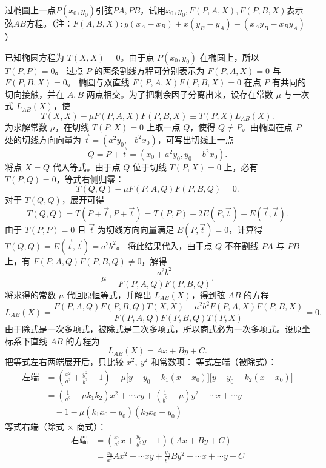 \begin{exercise}
过椭圆上一点$P(x_0,y_0)$引弦$PA,PB$，试用$x_0,y_0,F(P,A,X),F(P,B,X)$表示弦$AB$方程。（注：$F(A,B,X):y(x_A-x_B)+x(y_B-y_A)-(x_Ay_B-x_By_A)$）
\end{exercise}
\begin{solution}
已知椭圆方程为 $T(X,X) = 0$。由于点 $P(x_0,y_0)$ 在椭圆上，所以 $T(P,P) = 0$。
过点 $P$ 的两条割线方程可分别表示为 $F(P,A,X)=0$ 与 $F(P,B,X)=0$。
椭圆与双直线 $F(P,A,X)F(P,B,X)=0$ 在点 $P$ 有共同的切向接触，并在 $A,B$ 两点相交。为了把剩余因子分离出来，设存在常数 $\mu$ 与一次式 $L_{AB}(X)$，使
\[ T(X,X) - \mu F(P,A,X)F(P,B,X) \equiv T(P,X) L_{AB}(X). \]
为求解常数 $\mu$，在切线 $T(P,X)=0$ 上取一点 $Q$，使得 $Q \neq P$。由椭圆在点 $P$ 处的切线方向向量为 $\vec{t} = (a^2 y_0, -b^2 x_0)$，可写出切线上一点
\[ Q = P + \vec{t} = (x_0 + a^2 y_0, y_0 - b^2 x_0). \]
将点 $X = Q$ 代入等式。由于点 $Q$ 位于切线 $T(P,X)=0$ 上，必有 $T(P,Q) = 0$，等式右侧归零：
\[ T(Q,Q) - \mu F(P,A,Q)F(P,B,Q) = 0. \]
对于 $T(Q,Q)$，展开可得
\[ T(Q,Q) = T(P+\vec{t}, P+\vec{t}) = T(P,P) + 2E(P,\vec{t}) + E(\vec{t},\vec{t}). \]
由于 $T(P,P)=0$ 且 $\vec{t}$ 为切线方向向量满足 $E(P,\vec{t})=0$，计算得 $T(Q,Q) = E(\vec{t},\vec{t}) = a^2b^2$。
将此结果代入，由于点 $Q$ 不在割线 $PA$ 与 $PB$ 上，有 $F(P,A,Q)F(P,B,Q) \neq 0$，解得
\[ \mu = \frac{a^2b^2}{F(P,A,Q)F(P,B,Q)}. \]
将求得的常数 $\mu$ 代回原恒等式，并解出 $L_{AB}(X)$，得到弦 $AB$ 的方程
\[ L_{AB}(X) = \frac{F(P,A,Q) F(P,B,Q) T(X,X) - a^2b^2 F(P,A,X) F(P,B,X)}{F(P,A,Q) F(P,B,Q) T(P,X)} = 0. \]
由于除式是一次多项式，被除式是二次多项式，所以商式必为一次多项式。设原坐标系下直线 $AB$ 的方程为
\[
L_{AB}(X) = Ax + By + C.
\]
把等式左右两端展开后，只比较 $x^2,\ y^2$ 和常数项：
等式左端（被除式）：
\begin{align*}
    \text{左端} &= \left(\frac{x^2}{a^2} + \frac{y^2}{b^2} - 1\right) - \mu \big[y - y_0 - k_1(x-x_0)\big] \big[y - y_0 - k_2(x-x_0)\big] \\
    &= \left(\frac{1}{a^2} - \mu k_1k_2\right) x^2 + \cdots xy + \left(\frac{1}{b^2} - \mu\right) y^2 + \cdots x + \cdots y \\
    &\quad - 1 - \mu(k_1x_0 - y_0)(k_2x_0 - y_0)
\end{align*}
等式右端（除式 $\times$ 商式）：
\begin{align*}
    \text{右端} &= \left(\frac{x_0}{a^2}x + \frac{y_0}{b^2}y - 1\right) (Ax + By + C) \\
    &= \frac{x_0}{a^2}A x^2 + \cdots xy + \frac{y_0}{b^2}B y^2 + \cdots x + \cdots y - C
\end{align*}

\end{solution}
